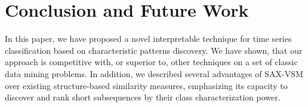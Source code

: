 \documentclass[conference]{IEEEtran}
\begin{document}
\section{Conclusion and Future Work} \label{conclusion}
In this paper, we have proposed a novel interpretable technique for time series classification
based on characteristic patterns discovery. We have shown, that our approach is competitive with, 
or superior to, other techniques on a set of classic data mining problems. In addition, 
we described several advantages of SAX-VSM over existing structure-based similarity measures,
emphasizing its capacity to discover and rank short subsequences by their class characterization
power.




\end{document}
